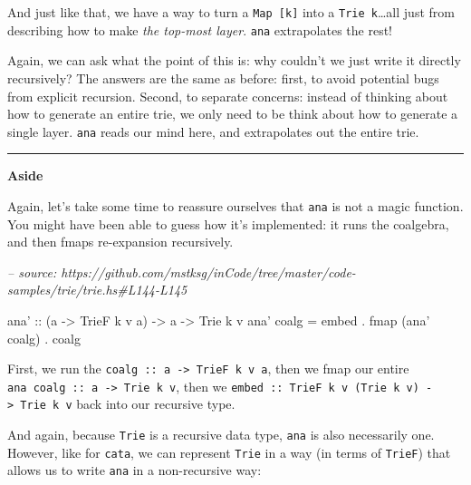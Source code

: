 \documentclass[]{article}
\newenvironment{Shaded}{}{}
\newcommand{\CommentTok}[1]{\textcolor[rgb]{0.38,0.63,0.69}{\textit{#1}}}
\newcommand{\DataTypeTok}[1]{\textcolor[rgb]{0.56,0.13,0.00}{#1}}
\newcommand{\FunctionTok}[1]{\textcolor[rgb]{0.02,0.16,0.49}{#1}}
\newcommand{\NormalTok}[1]{#1}
\newcommand{\OtherTok}[1]{\textcolor[rgb]{0.00,0.44,0.13}{#1}}
\begin{document}
And just like that, we have a way to turn a \texttt{Map\ {[}k{]}} into a
\texttt{Trie\ k}\ldots{}all just from describing how to make \emph{the top-most
layer}. \texttt{ana} extrapolates the rest!

Again, we can ask what the point of this is: why couldn't we just write it
directly recursively? The answers are the same as before: first, to avoid
potential bugs from explicit recursion. Second, to separate concerns: instead of
thinking about how to generate an entire trie, we only need to be think about
how to generate a single layer. \texttt{ana} reads our mind here, and
extrapolates out the entire trie.

\begin{center}\rule{0.5\linewidth}{\linethickness}\end{center}

\textbf{Aside}

Again, let's take some time to reassure ourselves that \texttt{ana} is not a
magic function. You might have been able to guess how it's implemented: it runs
the coalgebra, and then fmaps re-expansion recursively.

\begin{Shaded}
\begin{Highlighting}[]
\CommentTok{-- source: https://github.com/mstksg/inCode/tree/master/code-samples/trie/trie.hs#L144-L145}

\OtherTok{ana' ::}\NormalTok{ (a }\OtherTok{->} \DataTypeTok{TrieF}\NormalTok{ k v a) }\OtherTok{->}\NormalTok{ a }\OtherTok{->} \DataTypeTok{Trie}\NormalTok{ k v}
\NormalTok{ana' coalg }\FunctionTok{=}\NormalTok{ embed }\FunctionTok{.} \FunctionTok{fmap}\NormalTok{ (ana' coalg) }\FunctionTok{.}\NormalTok{ coalg}
\end{Highlighting}
\end{Shaded}

First, we run the \texttt{coalg\ ::\ a\ -\textgreater{}\ TrieF\ k\ v\ a}, then
we fmap our entire \texttt{ana\ coalg\ ::\ a\ -\textgreater{}\ Trie\ k\ v}, then
we \texttt{embed\ ::\ TrieF\ k\ v\ (Trie\ k\ v)\ -\textgreater{}\ Trie\ k\ v}
back into our recursive type.

And again, because \texttt{Trie} is a recursive data type, \texttt{ana} is also
necessarily one. However, like for \texttt{cata}, we can represent \texttt{Trie}
in a way (in terms of \texttt{TrieF}) that allows us to write \texttt{ana} in a
non-recursive way:
\end{document}
